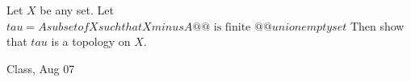 \begin{samepage}
\begin{ex}
Let $X$ be any set. Let 
$tau = {{ A subset of X such that X minus A @@\text{ is finite }@@ }} union {{ empty set }} $
Then show that $tau$ is a topology on $X$.
\end{ex}
\begin{source}
Class, Aug 07
\end{source}
\end{samepage}
